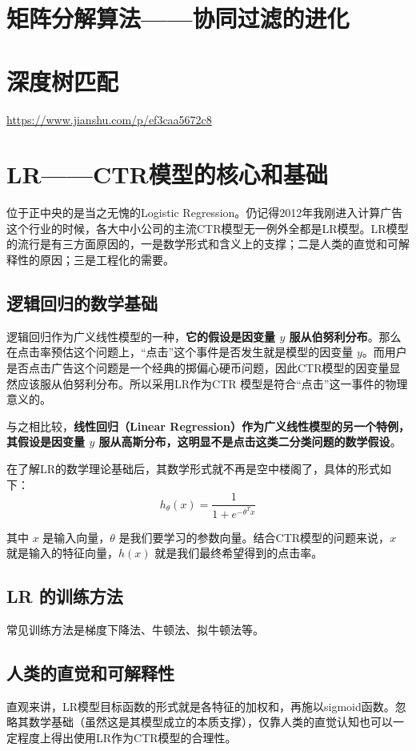 \documentclass[12pt]{article}
\begin{document}
\section{矩阵分解算法——协同过滤的进化}

\section{深度树匹配}
\url{https://www.jianshu.com/p/ef3caa5672c8}

\section{LR——CTR模型的核心和基础}
位于正中央的是当之无愧的Logistic Regression。仍记得2012年我刚进入计算广告这个行业的时候，各大中小公司的主流CTR模型无一例外全都是LR模型。LR模型的流行是有三方面原因的，一是数学形式和含义上的支撑；二是人类的直觉和可解释性的原因；三是工程化的需要。

\subsection{逻辑回归的数学基础}
逻辑回归作为广义线性模型的一种，\textbf{它的假设是因变量 $y$ 服从伯努利分布}。那么在点击率预估这个问题上，“点击”这个事件是否发生就是模型的因变量 $y$。而用户是否点击广告这个问题是一个经典的掷偏心硬币问题，因此CTR模型的因变量显然应该服从伯努利分布。所以采用LR作为CTR 模型是符合“点击”这一事件的物理意义的。

与之相比较，\textbf{线性回归（Linear Regression）作为广义线性模型的另一个特例，其假设是因变量 $y$ 服从高斯分布，这明显不是点击这类二分类问题的数学假设}。

在了解LR的数学理论基础后，其数学形式就不再是空中楼阁了，具体的形式如下：
$$
h_\theta(x) = \frac{1}{1 + e^{-\theta^Tx}}
$$

其中 $x$ 是输入向量，$\theta$ 是我们要学习的参数向量。结合CTR模型的问题来说，$x$ 就是输入的特征向量，$h(x)$ 就是我们最终希望得到的点击率。

\subsection{LR 的训练方法}
常见训练方法是梯度下降法、牛顿法、拟牛顿法等。

\subsection{人类的直觉和可解释性}
直观来讲，LR模型目标函数的形式就是各特征的加权和，再施以sigmoid函数。忽略其数学基础（虽然这是其模型成立的本质支撑），仅靠人类的直觉认知也可以一定程度上得出使用LR作为CTR模型的合理性。
\end{document}
